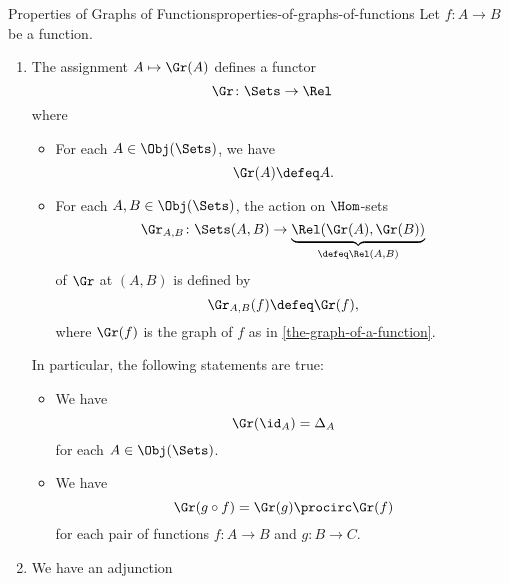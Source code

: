 \begin{proposition}{Properties of Graphs of Functions}{properties-of-graphs-of-functions}%
    Let $f\colon A\to B$ be a function.
    \begin{enumerate}
        \item\label{properties-of-graphs-of-functions-functoriality}The assignment $A\mapsto\Gr(A)$ defines a functor
            \[
                \Gr%
                \colon%
                \Sets%
                \to%
                \Rel%
            \]%
            where
            \begin{itemize}
                \item{}For each $A\in\Obj(\Sets)$, we have
                    \[
                        \Gr(A)%
                        \defeq
                        A.
                    \]%
                \item{}For each $A,B\in\Obj(\Sets)$, the action on $\Hom$-sets
                    \[
                        \Gr_{A,B}%
                        \colon%
                        \Sets(A,B)
                        \to
                        \underbrace{\Rel(\Gr(A),\Gr(B))}_{\defeq\Rel(A,B)}%
                    \]%
                    of $\Gr$ at $(A,B)$ is defined by
                    \[
                        \Gr_{A,B}(f)
                        \defeq
                        \Gr(f),
                    \]%
                    where $\Gr(f)$ is the graph of $f$ as in \cref{the-graph-of-a-function}.
            \end{itemize}
            In particular, the following statements are true:
            \begin{itemize}
                \item{}We have
                    \[
                        \Gr(\id_{A})%
                        =%
                        \Delta_{A}%
                    \]%
                    for each $A\in\Obj(\Sets)$.
                \item{}We have
                    \[
                        \Gr(g\circ f)%
                        =%
                        \Gr(g)\procirc\Gr(f)%
                    \]%
                    for each pair of functions $f\colon A\to B$ and $g\colon B\to C$.
            \end{itemize}
        \item\label{properties-of-graphs-of-functions-adjointness}We have an adjunction

\end{enumerate}
\end{proposition}
